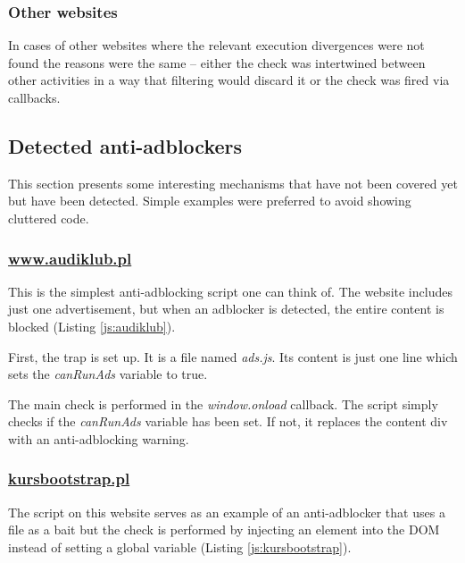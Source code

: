 

\subsubsection{Other websites}
In cases of other websites where the relevant execution divergences were not found 
the reasons were the same -- either the check was intertwined between other activities
in a way that filtering would discard it or the check was fired via callbacks.


\subsection{Detected anti-adblockers}

This section presents some interesting mechanisms 
that have not been covered yet but have been detected.
Simple examples were preferred to avoid showing cluttered code.

\subsubsection{\url{www.audiklub.pl}}
\label{audiklub}
This is the simplest anti-adblocking script one can think of. The website includes just one advertisement, 
but when an adblocker is detected, the entire content is blocked (Listing \ref{js:audiklub}).



First, the trap is set up. It is a file named \emph{ads.js}.
Its content is just one line which sets the \emph{canRunAds} variable to true.

The main check is performed in the \emph{window.onload} callback. The script simply checks
if the \emph{canRunAds} variable has been set. If not, it replaces the content div with an anti-adblocking warning.

\subsubsection{\url{kursbootstrap.pl}}
The script on this website serves as an example of an anti-adblocker that uses a file as a bait
but the check is performed by injecting an element into the DOM instead of setting a global variable
(Listing \ref{js:kursbootstrap}).

